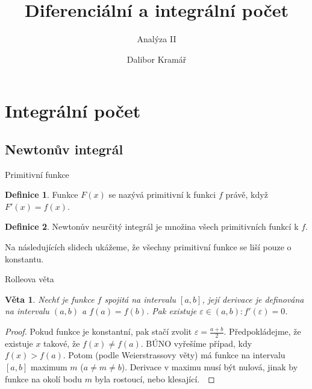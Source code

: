 \documentclass{beamer}
\title{Diferenciální a integrální počet} %
\subtitle{Analýza II} %
\author{Dalibor Kramář}
\newtheorem{thm}{Věta}
\theoremstyle{definition}
\newtheorem{dfn}{Definice}
\theoremstyle{example}
\begin{document}
  \shorthandoff{-}
  \frame[c]{\maketitle}


\section{Integrální počet}
\subsection{Newtonův integrál}
\begin{frame}{Primitivní funkce}
	\begin{dfn}
		Funkce $F(x)$ se nazývá primitivní k funkci $f$ právě, když $F'(x) = f(x)$.
	\end{dfn}
	\begin{dfn}
		Newtonův neurčitý integrál je množina všech primitivních funkcí k $f$.
	\end{dfn}
	Na následujících slidech ukážeme, že všechny primitivní funkce se liší pouze o konstantu.
\end{frame}

\begin{frame}{Rolleova věta}
	\begin{thm}
		Nechť je funkce $f$ spojitá na intervalu $[a, b]$, její derivace je definována na intervalu $(a, b)$ a $f(a) = f(b)$. Pak existuje $\varepsilon\in (a, b): f'(\varepsilon) = 0$.
	\end{thm}
	\begin{proof}
		Pokud funkce je konstantní, pak stačí zvolit $\varepsilon = \frac{a + b}{2}$. Předpokládejme, že existuje $x$ takové, že $f(x) \neq f(a)$. BÚNO vyřešíme případ, kdy $f(x) > f(a)$. Potom (podle Weierstrassovy věty) má funkce na intervalu $[a, b]$ maximum $m$ ($a \neq m \neq b$). Derivace v maximu musí být nulová, jinak by funkce na okolí bodu $m$ byla rostoucí, nebo klesající.~\cite{zaklady1}
	\end{proof}
\end{frame}
\end{document}
